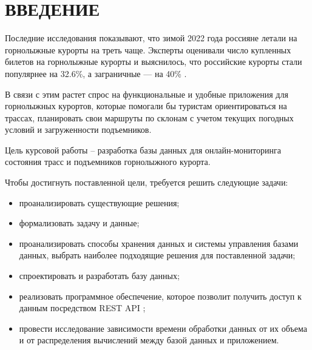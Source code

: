 \chapter*{ВВЕДЕНИЕ}

Последние исследования показывают, что зимой 2022 года россияне летали на горнолыжные курорты на треть чаще. Эксперты оценивали число купленных билетов на горнолыжные курорты и выяснилось, что российские курорты стали популярнее на 32.6\%, а заграничные — на 40\% \cite{stat}.

В связи с этим растет спрос на функциональные и удобные приложения для горнолыжных курортов, которые помогали бы туристам ориентироваться на трассах, планировать свои маршруты по склонам с учетом текущих погодных условий и загруженности подъемников.

Цель курсовой работы -- разработка базы данных для онлайн-мониторинга состояния трасс и подъемников горнолыжного курорта. 



Чтобы достигнуть поставленной цели, требуется решить следующие задачи:

\begin{itemize}
	\item проанализировать существующие решения;
	\item формализовать задачу и данные;
	\item проанализировать способы хранения данных и системы управления базами данных, выбрать наиболее подходящие решения для поставленной задачи;
	\item спроектировать и разработать базу данных;
    \item  реализовать программное обеспечение, которое позволит получить доступ к данным посредством REST API \cite{api};
    \item провести исследование зависимости времени обработки данных от их объема и от распределения вычислений между базой данных и приложением.
\end{itemize}

